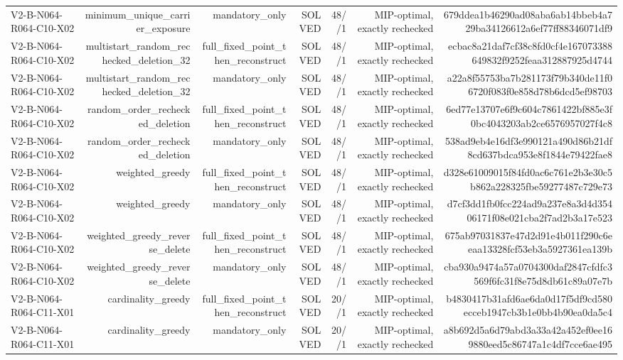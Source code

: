 {\begin{longtable}{lrrrrrr}
V2-B-N064-R064-C10-X02 & minimum\_unique\_carrier\_exposure & mandatory\_only & SOLVED & 48//1 & MIP-optimal, exactly rechecked & 679ddea1b46290ad08aba6ab14bbeb4a729ba34126612a6ef77ff88346071df9 \\
V2-B-N064-R064-C10-X02 & multistart\_random\_rechecked\_deletion\_32 & full\_fixed\_point\_then\_reconstruct & SOLVED & 48//1 & MIP-optimal, exactly rechecked & ecbac8a21daf7cf38c8fd0cf4e167073388649832f9252feaa312887925d4744 \\
V2-B-N064-R064-C10-X02 & multistart\_random\_rechecked\_deletion\_32 & mandatory\_only & SOLVED & 48//1 & MIP-optimal, exactly rechecked & a22a8f55753ba7b281173f79b340de11f06720f083f0e858d78b6dcd5ef98703 \\
V2-B-N064-R064-C10-X02 & random\_order\_rechecked\_deletion & full\_fixed\_point\_then\_reconstruct & SOLVED & 48//1 & MIP-optimal, exactly rechecked & 6ed77e13707e6f9c604c7861422bf885e3f0bc4043203ab2ce6576957027f4c8 \\
V2-B-N064-R064-C10-X02 & random\_order\_rechecked\_deletion & mandatory\_only & SOLVED & 48//1 & MIP-optimal, exactly rechecked & 538ad9eb4e16df3e990121a490d86b21df8cd637bdca953e8f1844e79422fae8 \\
V2-B-N064-R064-C10-X02 & weighted\_greedy & full\_fixed\_point\_then\_reconstruct & SOLVED & 48//1 & MIP-optimal, exactly rechecked & d328e61009015f84fd0ac6c761e2b3e30c5b862a228325fbe59277487c729e73 \\
V2-B-N064-R064-C10-X02 & weighted\_greedy & mandatory\_only & SOLVED & 48//1 & MIP-optimal, exactly rechecked & d7cf3dd1fb0fcc224ad9a237e8a3d4d35406171f08e021cba2f7ad2b3a17e523 \\
V2-B-N064-R064-C10-X02 & weighted\_greedy\_reverse\_delete & full\_fixed\_point\_then\_reconstruct & SOLVED & 48//1 & MIP-optimal, exactly rechecked & 675ab97031837e47d2d91e4b011f290c6eeaa13328fcf53eb3a5927361ea139b \\
V2-B-N064-R064-C10-X02 & weighted\_greedy\_reverse\_delete & mandatory\_only & SOLVED & 48//1 & MIP-optimal, exactly rechecked & cba930a9474a57a0704300daf2847cfdfc3569f6fc31f8e75d8db61c89a07e7b \\
V2-B-N064-R064-C11-X01 & cardinality\_greedy & full\_fixed\_point\_then\_reconstruct & SOLVED & 20//1 & MIP-optimal, exactly rechecked & b4830417b31afd6ae6da0d17f5df9cd580ecceb1947cb3b1e0bb4b90ea0da5c4 \\
V2-B-N064-R064-C11-X01 & cardinality\_greedy & mandatory\_only & SOLVED & 20//1 & MIP-optimal, exactly rechecked & a8b692d5a6d79abd3a33a42a452ef0ee169880eed5c86747a1c4df7cce6ae495 \\

\end{longtable}}
